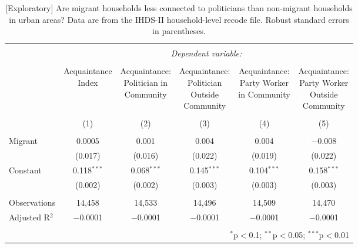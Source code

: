 \documentclass[
  11.5pt,
]{article}
\begin{document}
\begin{table}[!htbp] \centering 
  \caption{[Exploratory] Are migrant households less connected to politicians than non-migrant households in urban areas? Data are from the IHDS-II household-level recode file. Robust standard errors in parentheses.} 
  \label{tab:ihds2_acquaintance_urban} 
\fontsize{10pt}{10pt}\selectfont
\begin{tabular}{@{\extracolsep{5pt}}lccccc} 
\\[-1.8ex]\hline 
\hline \\[-1.8ex] 
 & \multicolumn{5}{c}{\textit{Dependent variable:}} \\ 
\cline{2-6} 
\\[-1.8ex] & \shortstack{Acquaintance \\ Index} & \shortstack{Acquaintance: \\ Politician in \\ Community} & \shortstack{Acquaintance: \\ Politician \\ Outside \\ Community} & \shortstack{Acquaintance: \\ Party Worker \\ in Community} & \shortstack{Acquaintance: \\ Party Worker \\ Outside \\ Community} \\ 
\\[-1.8ex] & (1) & (2) & (3) & (4) & (5)\\ 
\hline \\[-1.8ex] 
 Migrant & 0.0005 & 0.001 & 0.004 & 0.004 & $-$0.008 \\ 
  & (0.017) & (0.016) & (0.022) & (0.019) & (0.022) \\ 
  Constant & 0.118$^{***}$ & 0.068$^{***}$ & 0.145$^{***}$ & 0.104$^{***}$ & 0.158$^{***}$ \\ 
  & (0.002) & (0.002) & (0.003) & (0.003) & (0.003) \\ 
 \hline \\[-1.8ex] 
Observations & 14,458 & 14,533 & 14,496 & 14,509 & 14,470 \\ 
Adjusted R$^{2}$ & $-$0.0001 & $-$0.0001 & $-$0.0001 & $-$0.0001 & $-$0.0001 \\ 
\hline 
\hline \\[-1.8ex] 
\multicolumn{6}{r}{$^{*}$p$<$0.1; $^{**}$p$<$0.05; $^{***}$p$<$0.01} \\ 
\end{tabular} 
\end{table}
\end{document}
